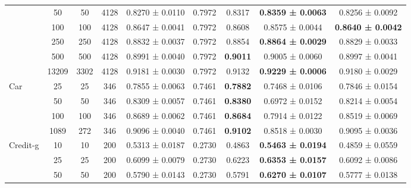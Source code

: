 \begin{table}
{\begin{tabular}[H]{@{}lcccccccc@{}}
                              & 50    & 50   & 4128 & 0.8270 ± 0.0110      & 0.7972               & 0.8317          & \textbf{0.8359 ± 0.0063} & 0.8256 ± 0.0092          \\
                              & 100   & 100  & 4128 & 0.8647 ± 0.0041      & 0.7972               & 0.8608          & 0.8575 ± 0.0044          & \textbf{0.8640 ± 0.0042} \\
                              & 250   & 250  & 4128 & 0.8832 ± 0.0037      & 0.7972               & 0.8854          & \textbf{0.8864 ± 0.0029} & 0.8829 ± 0.0033          \\
                              & 500   & 500  & 4128 & 0.8991 ± 0.0040      & 0.7972               & \textbf{0.9011} & 0.9005 ± 0.0060          & 0.8997 ± 0.0041          \\
                              & 13209 & 3302 & 4128 & 0.9181 ± 0.0030      & 0.7972               & 0.9132          & \textbf{0.9229 ± 0.0006} & 0.9180 ± 0.0029          \\
                              \midrule
\multirow{4}{*}{Car}          & 25    & 25   & 346  & 0.7855 ± 0.0063      & 0.7461               & \textbf{0.7882} & 0.7468 ± 0.0106          & 0.7846 ± 0.0154          \\
                              & 50    & 50   & 346  & 0.8309 ± 0.0057      & 0.7461               & \textbf{0.8380} & 0.6972 ± 0.0152          & 0.8214 ± 0.0054          \\
                              & 100   & 100  & 346  & 0.8689 ± 0.0062      & 0.7461               & \textbf{0.8684} & 0.7914 ± 0.0122          & 0.8519 ± 0.0069          \\
                              & 1089  & 272  & 346  & 0.9096 ± 0.0040      & 0.7461               & \textbf{0.9102} & 0.8518 ± 0.0030          & 0.9095 ± 0.0036          \\
                              \midrule
\multirow{6}{*}{Credit-g}     & 10    & 10   & 200  & 0.5313 ± 0.0187      & 0.2730               & 0.4863          & \textbf{0.5463 ± 0.0194} & 0.4859 ± 0.0559          \\
                              & 25    & 25   & 200  & 0.6099 ± 0.0079      & 0.2730               & 0.6223          & \textbf{0.6353 ± 0.0157} & 0.6092 ± 0.0086          \\
                              & 50    & 50   & 200  & 0.5790 ± 0.0143      & 0.2730               & 0.5791          & \textbf{0.6270 ± 0.0107} & 0.5777 ± 0.0138          \\

\end{tabular}}
\end{table}
